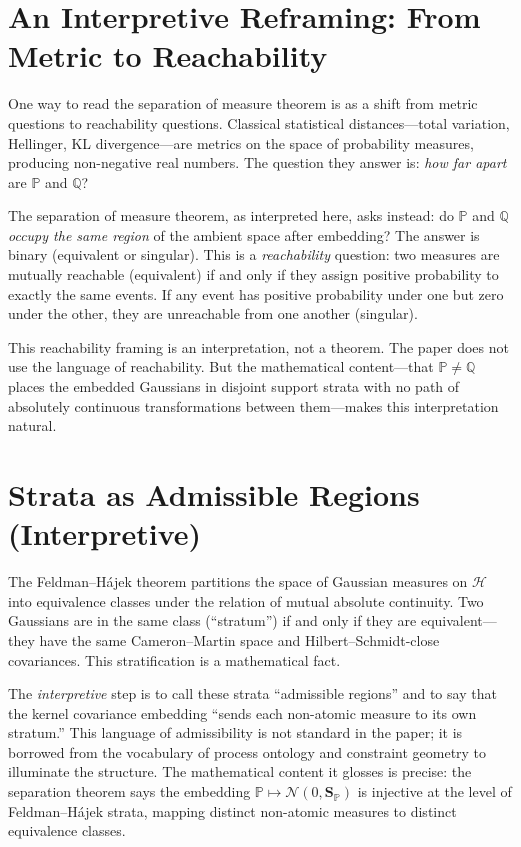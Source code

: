 \documentclass[12pt, oneside]{book}
\theoremstyle{plain}
\theoremstyle{definition}
\newcommand{\calH}{\mathcal{H}}
\newcommand{\calN}{\mathcal{N}}
\newcommand{\PP}{\mathbb{P}}
\newcommand{\QQ}{\mathbb{Q}}
\newcommand{\SP}{\mathbf{S}_{\PP}}
\begin{document}
\section{An Interpretive Reframing: From Metric to Reachability}

One way to read the separation of measure theorem is as a shift from metric questions to reachability questions. Classical statistical distances---total variation, Hellinger, KL divergence---are metrics on the space of probability measures, producing non-negative real numbers. The question they answer is: \emph{how far apart} are $\PP$ and $\QQ$?

The separation of measure theorem, as interpreted here, asks instead: do $\PP$ and $\QQ$ \emph{occupy the same region} of the ambient space after embedding? The answer is binary (equivalent or singular). This is a \emph{reachability} question: two measures are mutually reachable (equivalent) if and only if they assign positive probability to exactly the same events. If any event has positive probability under one but zero under the other, they are unreachable from one another (singular).

This reachability framing is an interpretation, not a theorem. The paper does not use the language of reachability. But the mathematical content---that $\PP \neq \QQ$ places the embedded Gaussians in disjoint support strata with no path of absolutely continuous transformations between them---makes this interpretation natural.

\section{Strata as Admissible Regions (Interpretive)}

The Feldman--H\'ajek theorem partitions the space of Gaussian measures on $\calH$ into equivalence classes under the relation of mutual absolute continuity. Two Gaussians are in the same class (``stratum'') if and only if they are equivalent---they have the same Cameron--Martin space and Hilbert--Schmidt-close covariances. This stratification is a mathematical fact.

The \emph{interpretive} step is to call these strata ``admissible regions'' and to say that the kernel covariance embedding ``sends each non-atomic measure to its own stratum.'' This language of admissibility is not standard in the paper; it is borrowed from the vocabulary of process ontology and constraint geometry to illuminate the structure. The mathematical content it glosses is precise: the separation theorem says the embedding $\PP \mapsto \calN(0, \SP)$ is injective at the level of Feldman--H\'ajek strata, mapping distinct non-atomic measures to distinct equivalence classes.
\end{document}
